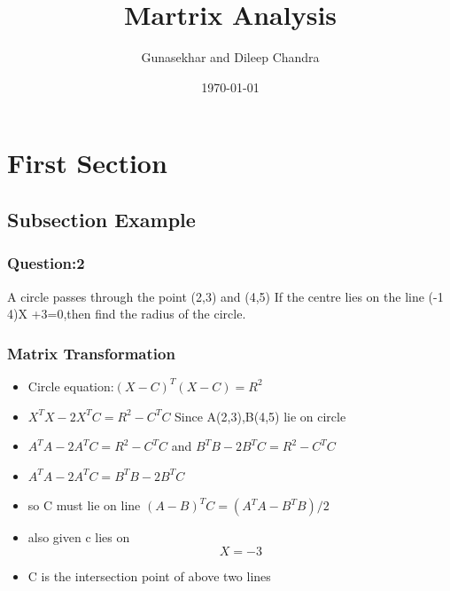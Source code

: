 \documentclass{beamer}
\title{\huge Martrix Analysis}
\author{Gunasekhar and Dileep Chandra}
\institute{IITH}
\date{\today}
\begin{document}
\begin{frame}[plain]
    \titlepage
\end{frame}




\section{First Section} %

\subsection{Subsection Example} %


\begin{frame}
\frametitle{Question:2}
A circle passes through the point (2,3) and (4,5) If the centre lies on the line (-1 4)X +3=0,then find the radius of the circle.
\end{frame}


\begin{frame}
\frametitle{Matrix Transformation}
\begin{itemize}
\item Circle equation:$(X-C)^T(X-C)=R^2$
\item $X^TX-2X^TC=R^2-C^TC$
 Since A(2,3),B(4,5) lie on circle
\item $A^TA-2A^TC=R^2-C^TC$ and $B^TB-2B^TC=R^2-C^TC$
\item $A^TA-2A^TC=B^TB-2B^TC$ 
\item so C must lie on line $(A-B)^TC=(A^TA-B^TB)/2$
\item also given c lies on 
\begin{equation}
[-1\ 4]X=-3
\end{equation}
\item C is the intersection point of above two lines
\end{itemize}
\end{frame}
\end{document}
